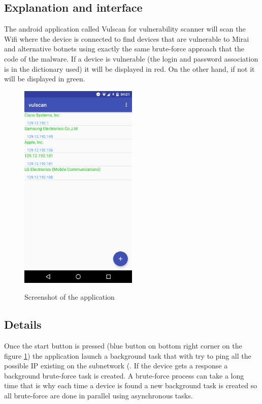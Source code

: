 \documentclass{report}
\begin{document}
\subsection{Explanation and interface}
The android application called Vulscan for vulnerability scanner will scan the Wifi where the device is connected to find devices that are vulnerable to Mirai and alternative botnets using exactly the same brute-force approach that the code of the malware. If a device is vulnerable (the login and password association is in the dictionary used) it will be displayed in red. On the other hand, if not it will be displayed in green.
\begin{figure}[h]
 \caption{Screenshot of the application}
 \centering
 \includegraphics[width=0.5\textwidth]{./img/screen-act}
 \label{fig:screen-act}
\end{figure}

\subsection{Details}
Once the start button is pressed (blue button on bottom right corner on the figure \ref{fig:screen-act}) the application launch a background task that with try to ping all the possible IP existing on the subnetwork (. If the device gets a response a background brute-force task is created. A brute-force process can take a long time that is why each time a device is found a new background task is created so all brute-force are done in parallel using asynchronous tasks.
\end{document}
